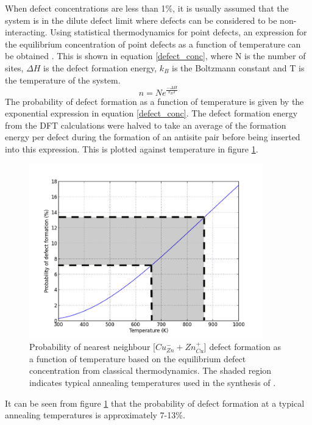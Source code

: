 When defect concentrations are less than 1\%, it is usually assumed that the system is in the dilute defect limit where defects can be considered to be non-interacting. Using statistical thermodynamics for point defects, an expression for the equilibrium concentration of point defects as a function of temperature can be obtained \cite{thermodynamics}. This is shown in equation \ref{defect_conc}, where N is the number of sites, $\Delta H$ is the defect formation energy, $k_B$ is the Boltzmann constant and T is the temperature of the system.
\begin{equation} \label{defect_conc}
n = Ne^{\frac{-\Delta H}{k_BT}}
\end{equation}
The probability of defect formation as a function of temperature is given by the exponential expression in equation \ref{defect_conc}. The defect formation energy from the DFT calculations were halved to take an average of the formation energy per defect during the formation of an antisite pair before being inserted into this expression. This is plotted against temperature in figure \ref{Cu-Zn_eqm_conc}. 
\begin{figure}[h!]
  \centering
    \includegraphics[width=0.9\textwidth]{figures/Cu-Zn_eqm_conc.png}
    \caption{Probability of nearest neighbour [$Cu_{Zn}^- + Zn_{Cu}^+$] defect formation as a function of temperature based on the equilibrium defect concentration from classical thermodynamics. The shaded region indicates typical annealing temperatures used in the synthesis of {\CZTS}.}
  \label{Cu-Zn_eqm_conc}
\end{figure}
It can be seen from figure \ref{Cu-Zn_eqm_conc} that the probability of defect formation at a typical annealing temperatures is approximately 7-13\%.
